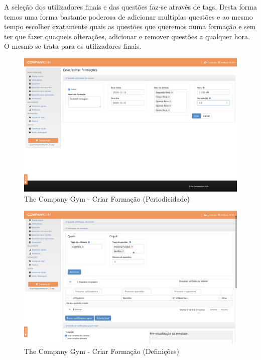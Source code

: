 A seleção dos utilizadores finais e das questões faz-se através de tags. Desta forma temos uma forma bastante poderosa de adicionar multiplas questões e ao mesmo tempo escolher exatamente quais as questões que queremos numa formação e sem ter que fazer quaqueis alterações, adicionar e remover questões a qualquer hora. O mesmo se trata para os utilizadores finais. 



\begin{figure}[ht!]
	\begin{center}
		\includegraphics[width=1\textwidth]{img/tcg/tcg-form.png}
		\caption{The Company Gym - Criar Formação (Periodicidade)}
		\label{fig:tcg-form}
	\end{center}
\end{figure}

\newpage


\begin{figure}[ht!]
	\begin{center}
		\includegraphics[width=1\textwidth]{img/tcg/tcg-form1.png}
		\caption{The Company Gym - Criar Formação (Definições)}
		\label{fig:tcg-form1}
	\end{center}
\end{figure}

